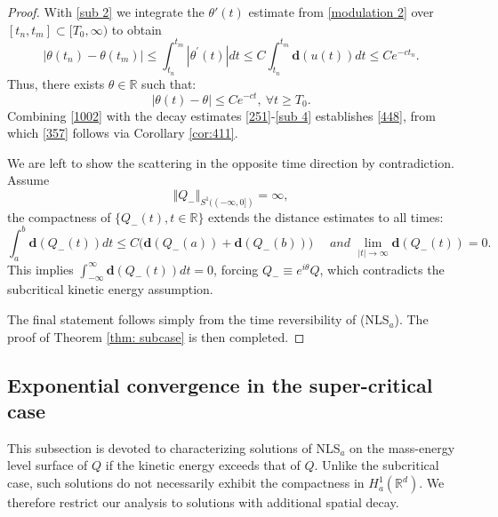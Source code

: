 \documentclass[12pt]{amsart}
\newcommand{\R}{\mathbb R}
\newcommand{\nha}{H^1_a}
\begin{document}
\begin{proof}
With \eqref{sub 2} we integrate the $\theta'(t)$ estimate from \eqref{modulation 2} over $[t_n, t_m]\subset[T_0,\infty)$ to obtain
\begin{equation}
|\theta (t_{n})-\theta (t_{m})|\leq \int_{t_{n}}^{t_{m}}|\theta ^{\prime
}(t)|dt\leq C\int_{t_{n}}^{t_{m}}\mathbf{d}(u(t))dt\leq Ce^{-ct_{n}}.
\label{sub 3}
\end{equation}%
Thus, there exists $\theta \in \mathbb{R}$ such that:
\begin{equation}
|\theta (t)-\theta |\leq Ce^{-ct},\ \forall t\geq T_{0}.  \label{sub 4}
\end{equation}
Combining \eqref{1002} with the decay estimates \eqref{251}-\eqref{sub 4} establishes \eqref{448}, from which \eqref{357} follows via Corollary \ref{cor:411}. 

We are left to show the scattering in the opposite time direction by contradiction. Assume 
\[
\Vert Q_{-}\Vert _{S^1((-\infty ,0])}=\infty, 
\]
the compactness of $\{Q_-(t), t\in \R\}$ extends the distance estimates to all times:
\begin{equation*}
\int_{a}^{b}\mathbf{d}(Q_{-}(t))dt\leq C\big(\mathbf{d}(Q_{-}(a))+\mathbf{d}%
(Q_{-}(b))\big)\quad\textit{ and }\lim_{|t|\to \infty}\mathbf{d}(Q_-(t))=0. 
\end{equation*}%
This implies $\int_{-\infty
}^{\infty }\mathbf{d}(Q_{-}(t))dt=0$, forcing $Q_{-}\equiv e^{i\theta
}Q$, which contradicts the subcritical kinetic energy assumption. 

The final statement follows simply from the time reversibility of (NLS$_a$). The proof of Theorem \ref{thm: subcase} is then completed. 
\end{proof}

\subsection{Exponential convergence in the super-critical case}

This subsection is devoted to characterizing solutions of NLS$_{a}$ on the mass-energy level surface of $Q$ if the kinetic energy exceeds that of $Q$. Unlike the subcritical case, such solutions do not necessarily exhibit the compactness in $\nha(\R^d)$. We therefore restrict our analysis to solutions with additional spatial decay.
\end{document}
